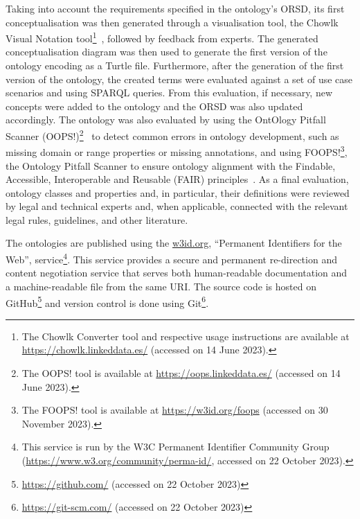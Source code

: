 Taking into account the requirements specified in the ontology's ORSD, its first conceptualisation was then generated through a visualisation tool, the Chowlk Visual Notation tool\footnote{The Chowlk Converter tool and respective usage instructions are available at \url{https://chowlk.linkeddata.es/} (accessed on 14 June 2023).}~\citep{chavez-feria_chowlk_2022}, followed by feedback from experts. The generated conceptualisation diagram was then used to generate the first version of the ontology encoding as a Turtle file.
Furthermore, after the generation of the first version of the ontology, the created terms were evaluated against a set of use case scenarios and using SPARQL queries. From this evaluation, if necessary, new concepts were added to the ontology and the ORSD was also updated accordingly. The ontology was also evaluated by using the OntOlogy Pitfall Scanner (OOPS!)\footnote{The OOPS! tool is available at \url{https://oops.linkeddata.es/} (accessed on 14 June 2023).}~\citep{poveda-villalon_oops_2014} to detect common errors in ontology development, such as missing domain or range properties or missing annotations, and using FOOPS!\footnote{The FOOPS! tool is available at \url{https://w3id.org/foops} (accessed on 30 November 2023).}, the Ontology Pitfall Scanner to ensure ontology alignment with the Findable, Accessible, Interoperable and Reusable (FAIR) principles~\citep{garijo_foops_2021}.
As a final evaluation, ontology classes and properties and, in particular, their definitions were reviewed by legal and technical experts and, when applicable, connected with the relevant legal rules, guidelines, and other literature.

The ontologies are published using the \url{w3id.org}, ``Permanent Identifiers for the Web'', service\footnote{This service is run by the W3C Permanent Identifier Community Group (\url{https://www.w3.org/community/perma-id/}, accessed on 22 October 2023).}.
This service provides a secure and permanent re-direction and content negotiation service that serves both human-readable documentation and a machine-readable file from the same URI.
The source code is hosted on GitHub\footnote{\url{https://github.com/} (accessed on 22 October 2023)} and version control is done using Git\footnote{\url{https://git-scm.com/} (accessed on 22 October 2023)}.


